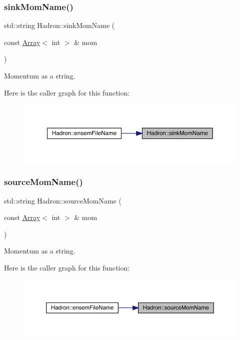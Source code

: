 \subsubsection{\texorpdfstring{sinkMomName()}{sinkMomName()}}
{\footnotesize\ttfamily std\+::string Hadron\+::sink\+Mom\+Name (\begin{DoxyParamCaption}\item[{const \mbox{\hyperlink{classXMLArray_1_1Array}{Array}}$<$ int $>$ \&}]{mom }\end{DoxyParamCaption})}



Momentum as a string. 

Here is the caller graph for this function\+:
\nopagebreak
\begin{figure}[H]
\begin{center}
\leavevmode
\includegraphics[width=350pt]{d1/daf/namespaceHadron_aaa6ace3b1a5c63de278a8bcb9fa80c49_icgraph}
\end{center}
\end{figure}
\mbox{\label{namespaceHadron_addad39b9d17263485541d757bb712420}} 
\subsubsection{\texorpdfstring{sourceMomName()}{sourceMomName()}}
{\footnotesize\ttfamily std\+::string Hadron\+::source\+Mom\+Name (\begin{DoxyParamCaption}\item[{const \mbox{\hyperlink{classXMLArray_1_1Array}{Array}}$<$ int $>$ \&}]{mom }\end{DoxyParamCaption})}



Momentum as a string. 

Here is the caller graph for this function\+:
\nopagebreak
\begin{figure}[H]
\begin{center}
\leavevmode
\includegraphics[width=350pt]{d1/daf/namespaceHadron_addad39b9d17263485541d757bb712420_icgraph}
\end{center}
\end{figure}
\mbox{\label{namespaceHadron_ae0f88dc43657f9dd4f118d41608859cc}} 
